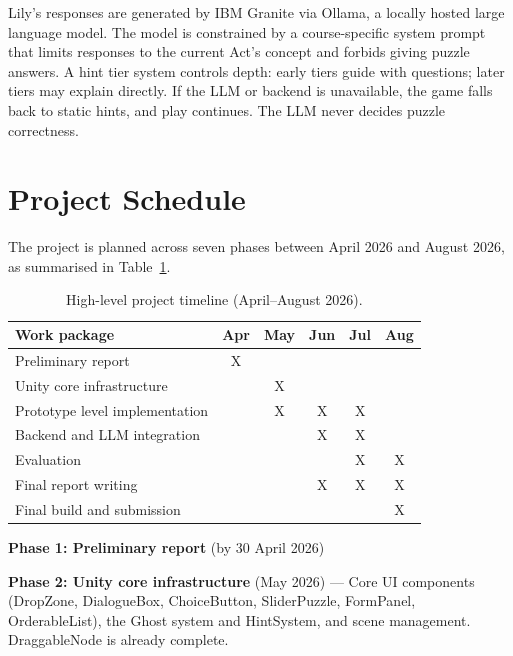 \documentclass[11pt,a4paper]{article}
\begin{document}
Lily's responses are generated by IBM Granite via Ollama, a locally hosted large language model. The model is constrained by a course-specific system prompt that limits responses to the current Act's concept and forbids giving puzzle answers. A hint tier system controls depth: early tiers guide with questions; later tiers may explain directly. If the LLM or backend is unavailable, the game falls back to static hints, and play continues. The LLM never decides puzzle correctness.

\section{Project Schedule}

The project is planned across seven phases between April 2026 and August 2026, as summarised in Table~\ref{tab:timeline}.

\begin{table}[h]
\centering
\small
\begin{tabular}{p{4.8cm}ccccc}
\toprule
\textbf{Work package} & \textbf{Apr} & \textbf{May} & \textbf{Jun} & \textbf{Jul} & \textbf{Aug} \\
\midrule
Preliminary report         & X &   &   &   &   \\
Unity core infrastructure  &   & X &   &   &   \\
Prototype level implementation &   & X & X & X &   \\
Backend and LLM integration &   &   & X & X &   \\
Evaluation                 &   &   &   & X & X \\
Final report writing       &   &   & X & X & X \\
Final build and submission &   &   &   &   & X \\
\bottomrule
\end{tabular}
\caption{High-level project timeline (April--August 2026).}
\label{tab:timeline}
\end{table}

\textbf{Phase 1: Preliminary report} (by 30 April 2026)

\textbf{Phase 2: Unity core infrastructure} (May 2026) --- Core UI components (DropZone, DialogueBox, ChoiceButton, SliderPuzzle, FormPanel, OrderableList), the Ghost system and HintSystem, and scene management. DraggableNode is already complete.
\end{document}
